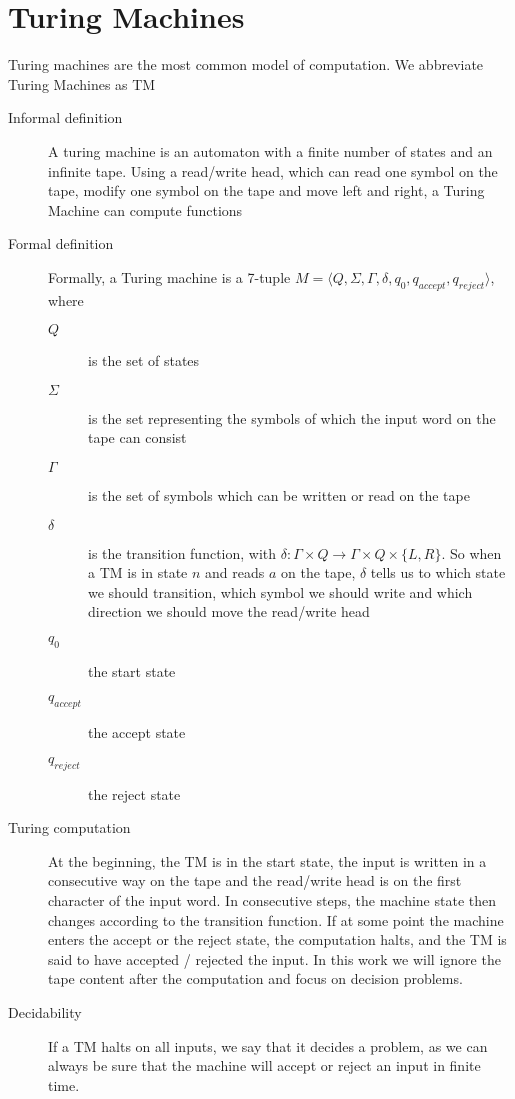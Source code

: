 \section{Turing Machines}\label{sec:turing-machines}
Turing machines are the most common model of computation. We abbreviate Turing Machines as TM
\begin{description}
    \item[Informal definition] A turing machine is an automaton with a finite number of states and an infinite tape. Using a read/write head, which can read one symbol on the tape, modify one symbol on the tape and move left and right, a Turing Machine can compute functions
    \item[Formal definition] Formally, a Turing machine is a 7-tuple $M = \langle  Q, \Sigma, \Gamma, \delta, q_0, q_{accept}, q_{reject}\rangle$, where
    \begin{description}
        \item[$Q$] is the set of states
        \item[$\Sigma$] is the set representing the symbols of which the input word on the tape can consist
        \item[$\Gamma$] is the set of symbols which can be written or read on the tape
        \item[$\delta$] is the transition function, with $\delta : \Gamma \times Q \to \Gamma \times Q \times \{L, R\}$. So when a TM is in state $n$ and reads $a$ on the tape, $\delta$ tells us to which state we should transition, which symbol we should write and which direction we should move the read/write head
        \item[$q_0$] the start state
        \item[$q_{accept}$] the accept state
        \item[$q_{reject}$] the reject state
    \end{description}
    \item[Turing computation] At the beginning, the TM is in the start state, the input is written in a consecutive way on the tape and the read/write head is on the first character of the input word. In consecutive steps, the machine state then changes according to the transition function. If at some point the machine enters the accept or the reject state, the computation halts, and the TM is said to have accepted / rejected the input. In this work we will ignore the tape content after the computation and focus on decision problems.
    \item[Decidability] If a TM halts on all inputs, we say that it decides a problem, as we can always be sure that the machine will accept or reject an input in finite time.

\end{description}
